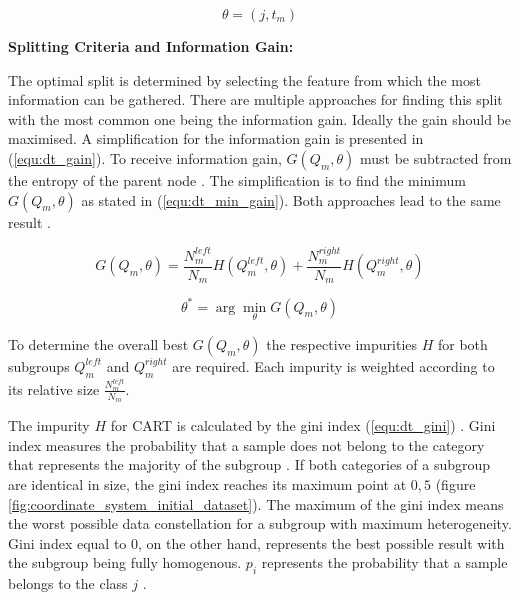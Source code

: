 \begin{equation}
    \theta = (j, t_{m})
    \label{equ:dt_split}
\end{equation}

\textbf{Splitting Criteria and Information Gain:}

The optimal split is determined by selecting the feature from which the most information can be gathered. There are multiple approaches 
for finding this split with the most common one being the information gain. Ideally the gain should be maximised. A simplification 
for the information gain is presented in (\ref{equ:dt_gain}). To receive information gain, \(G(Q_{m}, \theta)\) must be subtracted from 
the entropy of the parent node \cite[p.613f]{tangirala2020evaluating}. The simplification is to find the minimum \(G(Q_{m}, \theta)\) as stated in (\ref{equ:dt_min_gain}). Both
approaches lead to the same result \cite{scikit-decision_tree}. 

\begin{equation}
    G(Q_{m},\theta) = \frac{N^{left}_{m}}{N_{m}} H(Q^{left}_{m}, \theta ) + \frac{N^{right}_{m}}{N_{m}} H(Q^{right}_{m}, \theta )
    \label{equ:dt_gain}
\end{equation}

\begin{equation}
    \theta ^* = \arg \min_{\theta}  G(Q_{m}, \theta)
    \label{equ:dt_min_gain}
\end{equation}

To determine the overall best \(G(Q_{m}, \theta)\) the respective impurities \(H\) for both subgroups \(Q^{left}_{m}\) 
and \(Q^{right}_{m}\) are required. Each impurity is weighted according to its relative size 
\(\frac{N^{left}_{m}}{N_{m}}\).

The impurity \(H\) for \ac{CART} is calculated by the gini index (\ref{equ:dt_gini}) \cite[p.613f]{tangirala2020evaluating}. Gini index measures the probability that a sample 
does not belong to the category that represents the majority of the subgroup \cite[p. 335]{James2021}. If both 
categories of a subgroup are identical in size, the gini index reaches its maximum point at \(0,5\) (figure \ref{fig:coordinate_system_initial_dataset}). The 
maximum of the gini index means the worst possible data constellation for a subgroup with maximum heterogeneity. 
Gini index equal to \(0\), on the other hand, represents the best possible result with the subgroup being fully 
homogenous. \(p_{i}\) represents the probability that a sample belongs to the class \(j\) \cite[p. 335]{James2021}.

